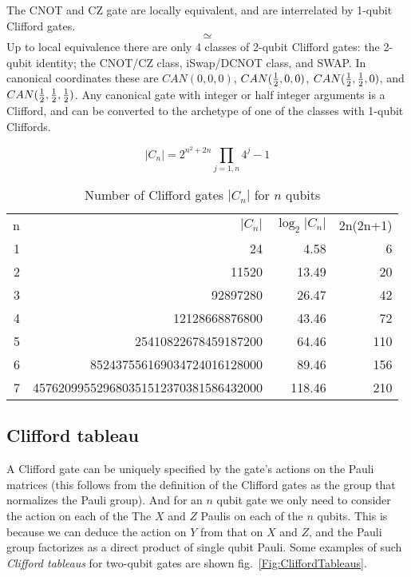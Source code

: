 The CNOT and CZ gate are locally equivalent, and are interrelated by 1-qubit Clifford gates. 
$$

\simeq

$$
Up to local equivalence there are only 4 classes of 2-qubit Clifford gates: the 2-qubit identity; the CNOT/CZ class, iSwap/DCNOT class, and SWAP. In canonical coordinates these are $CAN(0,0,0)$, $CAN(\half,0,0)$, $CAN(\half,\half,0)$, and $CAN(\half,\half,\half)$.  Any canonical gate with integer or half integer arguments is a Clifford, and can be converted to the archetype of one of the classes with 1-qubit Cliffords.  




\begin{table*}[tp]
\caption{Number of Clifford gates $|C_n|$ for $n$ qubits \cite{???}}
\label{Fig:CliffordNumbers}
$$|C_n| = 2^{n^2+2n} \prod_{j=1,n} 4^j-1$$
\begin{center}
\begin{tabular}{rrrr}
n &  $|C_n|$ & $\log_2 |C_n|$ & 2n(2n+1) \\
1 & 24 & 4.58 & 6 \\
2 & 11520 & 13.49 & 20 \\
3 & 92897280 & 26.47 & 42 \\
4 & 12128668876800 & 43.46 & 72 \\
5 & 25410822678459187200 & 64.46 & 110 \\
6 & 852437556169034724016128000 & 89.46 & 156 \\
7 & 457620995529680351512370381586432000 & 118.46 & 210 \\
\end{tabular}
\end{center}
\end{table*}



\subsection{Clifford tableau}

A Clifford gate can be uniquely specified by the gate's actions on the Pauli matrices (this follows from the definition of the Clifford gates as the group that normalizes the Pauli group). And for an $n$ qubit gate we only need to consider the action on each of the The $X$ and $Z$ Paulis on each of the $n$ qubits. This is because we can deduce the action on $Y$ from that on $X$ and $Z$, and the Pauli group factorizes as a direct product of single qubit Pauli. Some examples of such {\sl Clifford tableaus} for two-qubit gates are shown fig.~\ref{Fig:CliffordTableaus}. 


